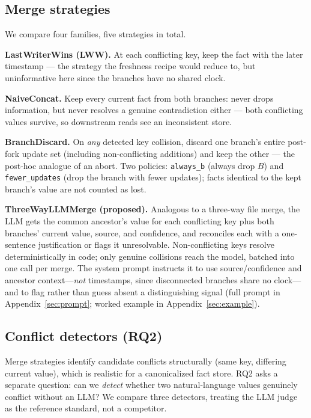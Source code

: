 \documentclass[11pt]{article}
\begin{document}
\subsection{Merge strategies}

We compare four families, five strategies in total.

\noindent\textbf{LastWriterWins (LWW).} At each conflicting key, keep the fact
with the later timestamp --- the strategy the freshness recipe
\citep{reddy2026freshness} would reduce to, but uninformative here since the
branches have no shared clock.

\noindent\textbf{NaiveConcat.} Keep every current fact from both branches:
never drops information, but never resolves a genuine contradiction either ---
both conflicting values survive, so downstream reads see an inconsistent store.

\noindent\textbf{BranchDiscard.} On \emph{any} detected key collision, discard
one branch's entire post-fork update set (including non-conflicting additions)
and keep the other --- the post-hoc analogue of an abort. Two policies:
\texttt{always\_b} (always drop $B$) and \texttt{fewer\_updates} (drop the
branch with fewer updates); facts identical to the kept branch's value are not
counted as lost.

\noindent\textbf{ThreeWayLLMMerge (proposed).} Analogous to a three-way file
merge, the LLM gets the common ancestor's value for each conflicting key plus
both branches' current value, source, and confidence, and reconciles each
with a one-sentence justification or flags it unresolvable. Non-conflicting
keys resolve deterministically in code; only genuine collisions reach the
model, batched into one call per merge. The system prompt instructs it to use
source/confidence and ancestor context---\emph{not} timestamps, since
disconnected branches share no clock---and to flag rather than guess absent a
distinguishing signal (full prompt in Appendix~\ref{sec:prompt}; worked
example in Appendix~\ref{sec:example}).

\subsection{Conflict detectors (RQ2)}

Merge strategies identify candidate conflicts structurally (same key,
differing current value), which is realistic for a canonicalized fact store.
RQ2 asks a separate question: can we \emph{detect} whether two
natural-language values genuinely conflict without an LLM? We compare three
detectors, treating the LLM judge as the reference standard, not a competitor.
\end{document}
